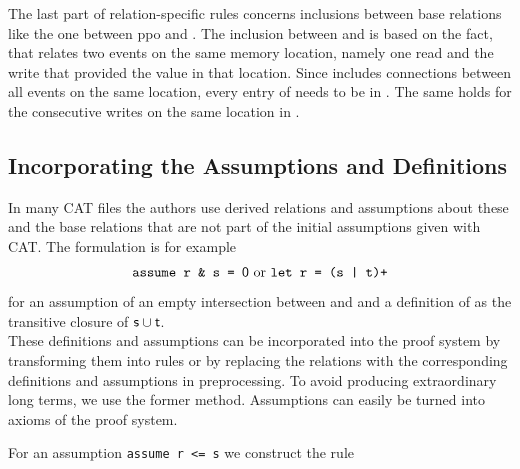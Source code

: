 \documentclass[a4paper,twoside,12pt, english]{article}
\begin{document}
The last part of relation-specific rules concerns inclusions between base relations like the one between \textsf{ppo} and \po. The inclusion between \rf{} and \loc{} is based on the fact, that \rf{} relates two events on the same memory location, namely one read and the write that provided the value in that location. Since \loc{} includes connections between all events on the same location, every entry of \rf{} needs to be in \loc{}. The same holds for the consecutive writes on the same location in \co{}. 


\subsection{Incorporating the Assumptions and Definitions}\label{sec:assumptions}
In many CAT files the authors use derived relations and assumptions about these and the base relations that are not part of the initial assumptions given with CAT. The formulation is for example
\[ \texttt{assume r \& s = \textsf{\upshape 0}} \text{ or } \texttt{let r = (s | t)+}\]
for an assumption of an empty intersection between \relr{} and \rels{} and a definition of \relr{} as the transitive closure of $\sf s \cup t$. \\
These definitions and assumptions can be incorporated into the proof system by transforming them into rules or by replacing the relations with the corresponding definitions and assumptions in preprocessing. To avoid producing extraordinary long terms, we use the former method.
Assumptions can easily be turned into axioms of the proof system. 

\noindent For an assumption \texttt{assume r <= s} we construct the rule 
\begin{mathpar}
\end{mathpar}
\end{document}
